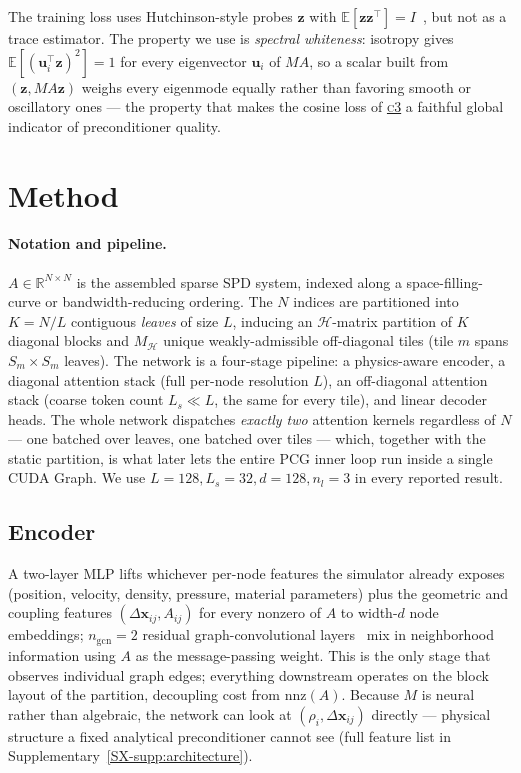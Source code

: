 \documentclass[acmtog,anonymous,review]{acmart}
\theoremstyle{plain}
\begin{document}
The training loss uses Hutchinson-style probes $\mathbf{z}$ with
$\mathbb{E}[\mathbf{z}\mathbf{z}^\top]\!=\!I$~\cite{hutchinson1989stochastic}, but not as a
trace estimator. The property we use is \emph{spectral whiteness}: isotropy gives
$\mathbb{E}[(\mathbf{u}_i^\top\mathbf{z})^2]\!=\!1$ for every eigenvector $\mathbf{u}_i$ of
$MA$, so a scalar built from $(\mathbf{z},MA\mathbf{z})$ weighs every eigenmode equally
rather than favoring smooth or oscillatory ones --- the property that makes the cosine loss
of \hyperref[intro:loss]{\textsc{c3}} a faithful global indicator of preconditioner quality.

\section{Method}
\label{sec:method}

\paragraph{Notation and pipeline.}
$A\!\in\!\mathbb{R}^{N\times N}$ is the assembled sparse SPD system, indexed along a
space-filling-curve or bandwidth-reducing ordering. The $N$ indices are partitioned into
$K\!=\!N/L$ contiguous \emph{leaves} of size $L$, inducing an $\mathcal{H}$-matrix
partition of $K$ diagonal blocks and $M_{\mathcal{H}}$ unique weakly-admissible
off-diagonal tiles (tile $m$ spans $S_m\!\times\!S_m$ leaves). The network is a four-stage
pipeline: a physics-aware encoder, a diagonal attention stack (full per-node resolution
$L$), an off-diagonal attention stack (coarse token count $L_s\!\ll\!L$, the same for
every tile), and linear decoder heads. The whole network dispatches \emph{exactly two}
attention kernels regardless of $N$ --- one batched over leaves, one batched over tiles
--- which, together with the static partition, is what later lets the entire PCG inner
loop run inside a single CUDA Graph. We use $L\!=\!128, L_s\!=\!32, d\!=\!128, n_l\!=\!3$
in every reported result.

\subsection{Encoder}
\label{sec:method:encoder}
A two-layer MLP lifts whichever per-node features the simulator already exposes
(position, velocity, density, pressure, material parameters) plus the geometric and
coupling features $(\Delta\mathbf{x}_{ij}, A_{ij})$ for every nonzero of $A$ to width-$d$
node embeddings; $n_{\mathrm{gcn}}\!=\!2$ residual graph-convolutional
layers~\cite{kipf2017semi} mix in neighborhood information using $A$ as the
message-passing weight. This is the only stage that observes individual graph edges;
everything downstream operates on the block layout of the partition, decoupling cost
from $\mathrm{nnz}(A)$. Because $M$ is neural rather than algebraic, the network can
look at $(\rho_i, \Delta\mathbf{x}_{ij})$ directly --- physical structure a fixed
analytical preconditioner cannot see (full feature list in
Supplementary~\ref{SX-supp:architecture}).
\end{document}
